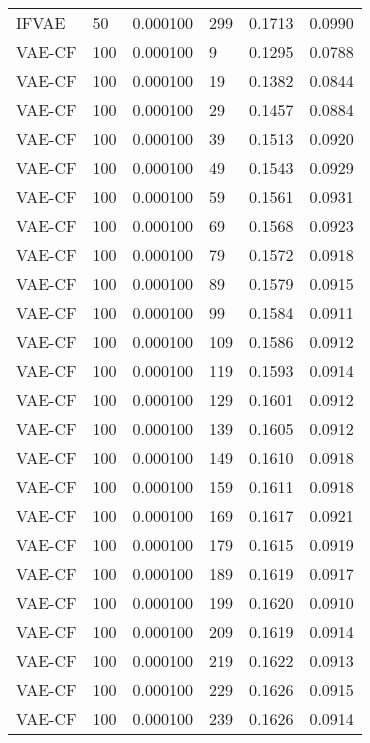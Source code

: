 \begin{tabular}{llrlrr}
   IFVAE &   50 &  0.000100 &   299 &  0.1713 &       0.0990 \\
  VAE-CF &  100 &  0.000100 &     9 &  0.1295 &       0.0788 \\
  VAE-CF &  100 &  0.000100 &    19 &  0.1382 &       0.0844 \\
  VAE-CF &  100 &  0.000100 &    29 &  0.1457 &       0.0884 \\
  VAE-CF &  100 &  0.000100 &    39 &  0.1513 &       0.0920 \\
  VAE-CF &  100 &  0.000100 &    49 &  0.1543 &       0.0929 \\
  VAE-CF &  100 &  0.000100 &    59 &  0.1561 &       0.0931 \\
  VAE-CF &  100 &  0.000100 &    69 &  0.1568 &       0.0923 \\
  VAE-CF &  100 &  0.000100 &    79 &  0.1572 &       0.0918 \\
  VAE-CF &  100 &  0.000100 &    89 &  0.1579 &       0.0915 \\
  VAE-CF &  100 &  0.000100 &    99 &  0.1584 &       0.0911 \\
  VAE-CF &  100 &  0.000100 &   109 &  0.1586 &       0.0912 \\
  VAE-CF &  100 &  0.000100 &   119 &  0.1593 &       0.0914 \\
  VAE-CF &  100 &  0.000100 &   129 &  0.1601 &       0.0912 \\
  VAE-CF &  100 &  0.000100 &   139 &  0.1605 &       0.0912 \\
  VAE-CF &  100 &  0.000100 &   149 &  0.1610 &       0.0918 \\
  VAE-CF &  100 &  0.000100 &   159 &  0.1611 &       0.0918 \\
  VAE-CF &  100 &  0.000100 &   169 &  0.1617 &       0.0921 \\
  VAE-CF &  100 &  0.000100 &   179 &  0.1615 &       0.0919 \\
  VAE-CF &  100 &  0.000100 &   189 &  0.1619 &       0.0917 \\
  VAE-CF &  100 &  0.000100 &   199 &  0.1620 &       0.0910 \\
  VAE-CF &  100 &  0.000100 &   209 &  0.1619 &       0.0914 \\
  VAE-CF &  100 &  0.000100 &   219 &  0.1622 &       0.0913 \\
  VAE-CF &  100 &  0.000100 &   229 &  0.1626 &       0.0915 \\
  VAE-CF &  100 &  0.000100 &   239 &  0.1626 &       0.0914 \\

\end{tabular}
